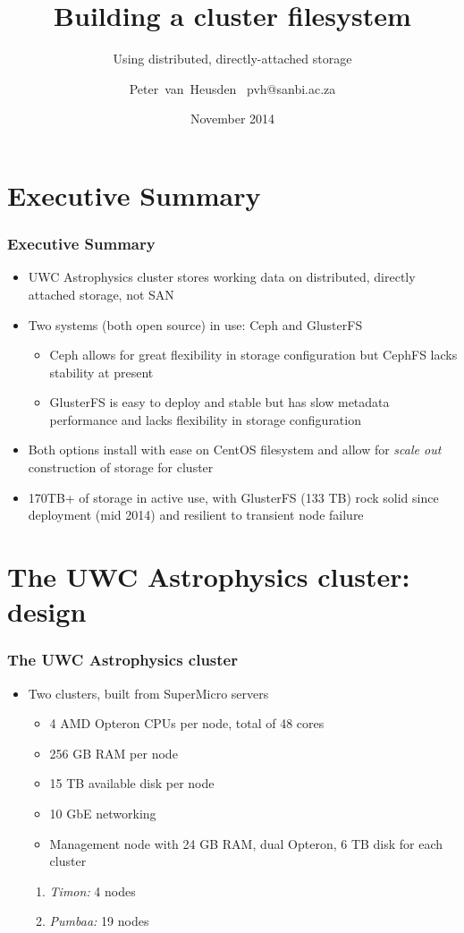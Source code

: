 \documentclass[handout]{beamer}
\title{Building a cluster filesystem}
\subtitle{Using distributed, directly-attached storage}
\author{\texorpdfstring{Peter~van~Heusden\newline
~pvh@sanbi.ac.za}{Peter~van~Heusden}}
\institute[UWC]
{
Information and Communication Services\\
University of the Western Cape\\
Bellville, South Africa\\
\insertlogo}
\date{November 2014}
\begin{document}
\begin{frame}
\logo{}
\titlepage
\end{frame}

\section{Executive Summary}
\begin{frame}
\frametitle{Executive Summary}
\begin{itemize}
\item UWC Astrophysics cluster stores working data on distributed, directly attached storage, not SAN
\pause
\item Two systems (both open source) in use: Ceph and GlusterFS
\pause
\begin{itemize}
\item Ceph allows for great flexibility in storage configuration but CephFS lacks stability at present
\pause
\item GlusterFS is easy to deploy and stable but has slow metadata performance and lacks flexibility in storage configuration
\end{itemize}
\pause
\item Both options install with ease on CentOS filesystem and allow for \emph{scale out} construction of storage for cluster
\pause
\item 170TB+ of storage in active use, with GlusterFS (133 TB) rock solid since deployment (mid 2014) and resilient to transient node failure
\end{itemize}
\end{frame}

\section{The UWC Astrophysics cluster: design}

\begin{frame}
\frametitle{The UWC Astrophysics cluster}
\begin{itemize}
 \item Two clusters, built from SuperMicro servers
 \begin{itemize}
 \item 4 AMD Opteron CPUs per node, total of 48 cores
 \item 256 GB RAM per node
 \item 15 TB available disk per node
 \item 10 GbE networking
 \item Management node with 24 GB RAM, dual Opteron, 6 TB disk for each cluster
 \end{itemize}
 \begin{enumerate}
 \pause
 \item \emph{Timon:} 4 nodes
 \pause
 \item \emph{Pumbaa:} 19 nodes
 \end{enumerate}
\end{itemize}
\end{frame}
\end{document}
